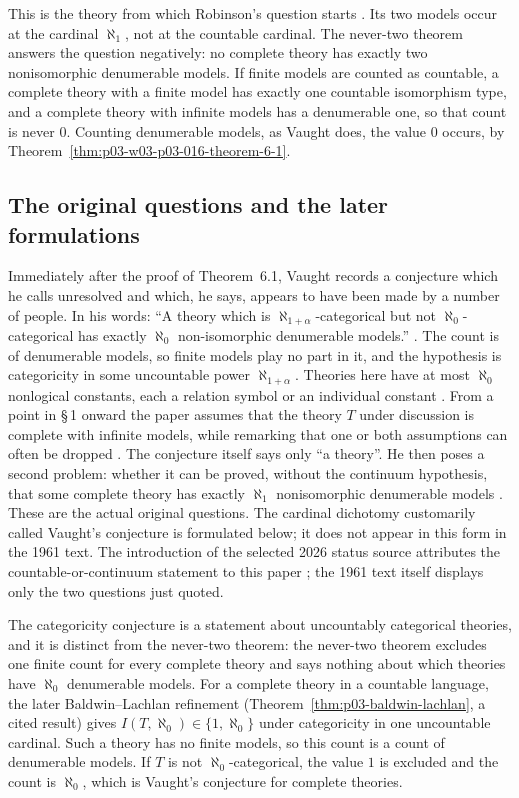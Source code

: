 This is the theory from which Robinson's question starts
\cite[p.~318]{Vaught1961}. Its two models occur at the cardinal
\(\aleph_1\), not at the countable cardinal. The never-two theorem answers
the question negatively: no complete theory has exactly two nonisomorphic
denumerable models. If finite models are counted as countable, a complete
theory with a finite model has exactly one countable isomorphism type, and a
complete theory with infinite models has a denumerable one, so that count is
never \(0\). Counting denumerable models, as Vaught does, the value \(0\)
occurs, by Theorem~\ref{thm:p03-w03-p03-016-theorem-6-1}.

\subsection{The original questions and the later formulations}
\label{sec:p03-vaught-original-problem}

Immediately after the proof of Theorem~6.1, Vaught records a conjecture
which he calls unresolved and which, he says, appears to have been made by
a number of people. In his words: ``A theory which is
\(\aleph_{1+\alpha}\)-categorical but not \(\aleph_0\)-categorical has
exactly \(\aleph_0\) non-isomorphic denumerable models.''
\cite[p.~320]{Vaught1961}. The count is of denumerable models, so finite
models play no part in it, and the hypothesis is categoricity in some
uncountable power \(\aleph_{1+\alpha}\). Theories here have at most
\(\aleph_0\) nonlogical constants, each a relation symbol or an individual
constant \cite[p.~304]{Vaught1961}. From a point in \S\,1 onward the paper
assumes that the theory \(T\) under discussion is complete with infinite
models, while remarking that one or both assumptions can often be dropped
\cite[p.~306]{Vaught1961}. The conjecture itself says only ``a theory''.
He then poses a second problem: whether it can be proved, without the
continuum hypothesis, that some complete theory has exactly \(\aleph_1\)
nonisomorphic denumerable models \cite[p.~320]{Vaught1961}. These are the
actual original questions. The cardinal dichotomy customarily called
Vaught's conjecture is formulated below; it does not appear in this form in
the 1961 text. The introduction of the selected 2026 status source
attributes the countable-or-continuum statement to this paper
\cite[p.~1]{GonzalezRosseggerTuretsky2026Status}; the 1961 text itself
displays only the two questions just quoted.

The categoricity conjecture is a statement about uncountably categorical
theories, and it is distinct from the never-two theorem: the never-two
theorem excludes one finite count for every complete theory and says nothing
about which theories have \(\aleph_0\) denumerable models. For a complete
theory in a countable language, the later Baldwin--Lachlan refinement
(Theorem~\ref{thm:p03-baldwin-lachlan}, a cited result) gives
\(I(T,\aleph_0)\in\{1,\aleph_0\}\) under categoricity in one uncountable
cardinal. Such a theory has no finite models, so this count is a count of
denumerable models. If \(T\) is not \(\aleph_0\)-categorical, the value
\(1\) is excluded and the count is \(\aleph_0\), which is Vaught's
conjecture for complete theories.

